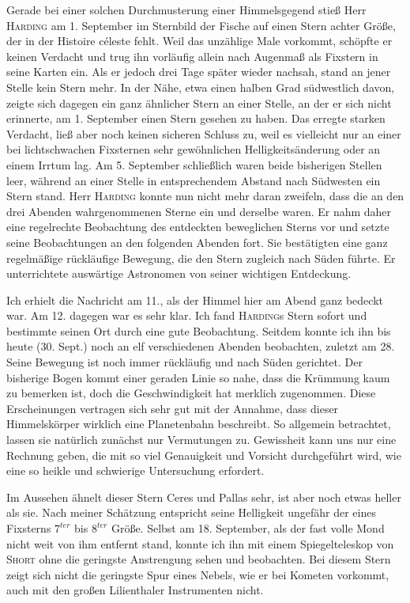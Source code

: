 Gerade bei einer solchen Durchmusterung einer Himmelsgegend stieß Herr \textsc{Harding} am 1. September im Sternbild der Fische auf einen Stern achter Größe, der in der Histoire céleste fehlt. Weil das unzählige Male vorkommt, schöpfte er keinen Verdacht und trug ihn vorläufig allein nach Augenmaß als Fixstern in seine Karten ein. Als er jedoch drei Tage später wieder nachsah, stand an jener Stelle kein Stern mehr. In der Nähe, etwa einen halben Grad südwestlich davon, zeigte sich dagegen ein ganz ähnlicher Stern an einer Stelle, an der er sich nicht erinnerte, am 1. September einen Stern gesehen zu haben. Das erregte starken Verdacht, ließ aber noch keinen sicheren Schluss zu, weil es vielleicht nur an einer bei lichtschwachen Fixsternen sehr gewöhnlichen Helligkeitsänderung oder an einem Irrtum lag. Am 5. September schließlich waren beide bisherigen Stellen leer, während an einer Stelle in entsprechendem Abstand nach Südwesten ein Stern stand. Herr \textsc{Harding} konnte nun nicht mehr daran zweifeln, dass die an den drei Abenden wahrgenommenen Sterne ein und derselbe waren. Er nahm daher eine regelrechte Beobachtung des entdeckten beweglichen Sterns vor und setzte seine Beobachtungen an den folgenden Abenden fort. Sie bestätigten eine ganz regelmäßige rückläufige Bewegung, die den Stern zugleich nach Süden führte. Er unterrichtete auswärtige Astronomen von seiner wichtigen Entdeckung.

Ich erhielt die Nachricht am 11., als der Himmel hier am Abend ganz bedeckt war. Am 12. dagegen war es sehr klar. Ich fand \textsc{Harding}s Stern sofort und bestimmte seinen Ort durch eine gute Beobachtung. Seitdem konnte ich ihn bis heute (30. Sept.) noch an elf verschiedenen Abenden beobachten, zuletzt am 28. Seine Bewegung ist noch immer rückläufig und nach Süden gerichtet. Der bisherige Bogen kommt einer geraden Linie so nahe, dass die Krümmung kaum zu bemerken ist, doch die Geschwindigkeit hat merklich zugenommen. Diese Erscheinungen vertragen sich sehr gut mit der Annahme, dass dieser Himmelskörper wirklich eine Planetenbahn beschreibt. So allgemein betrachtet, lassen sie natürlich zunächst nur Vermutungen zu. Gewissheit kann uns nur eine
Rechnung geben, die mit so viel Genauigkeit und Vorsicht durchgeführt wird, wie eine so heikle und schwierige Untersuchung erfordert.

Im Aussehen ähnelt dieser Stern Ceres und Pallas sehr, ist aber noch etwas heller als sie. Nach meiner Schätzung entspricht seine Helligkeit ungefähr der eines Fixsterns $7^{ter}$ bis $8^{ter}$ Größe. Selbst am 18. September, als der fast volle Mond nicht weit von ihm entfernt stand, konnte ich ihn mit einem Spiegelteleskop von \textsc{Short} ohne die geringste Anstrengung sehen und beobachten. Bei diesem Stern zeigt sich nicht die geringste Spur eines Nebels, wie er bei Kometen vorkommt, auch mit den großen Lilienthaler Instrumenten nicht.

